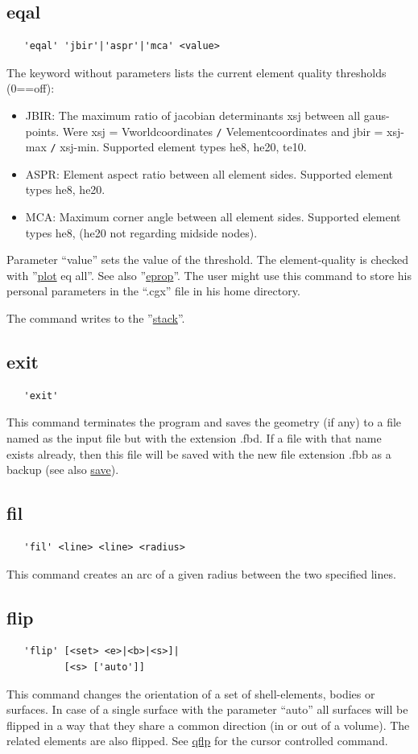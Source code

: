 \documentclass{article}
\providecommand{\htmlref}[2]{\hyperref[#2]{#1}}
\begin{document}
\subsection{\label{eqal}eqal}
\begin{verbatim}
   'eqal' 'jbir'|'aspr'|'mca' <value>
\end{verbatim}
The keyword without parameters lists the current element quality thresholds (0==off):
\begin{itemize}
\item JBIR: The maximum ratio of jacobian determinants xsj between all gaus-points. Were xsj = Vworldcoordinates \verb_/_ Velementcoordinates and jbir = xsj-max \verb_/_ xsj-min. Supported element types he8, he20, te10.
\item ASPR: Element aspect ratio between all element sides. Supported element types he8, he20.
\item MCA: Maximum corner angle between all element sides. Supported element types he8, (he20 not regarding midside nodes).
\end{itemize}
Parameter ``value'' sets the value of the threshold. The element-quality is checked with ''\htmlref{plot}{plot} eq all''. See also ''\htmlref{eprop}{eprop}''. The user might use this command to store his personal parameters in the ``.cgx'' file in his home directory.

The command writes to the ''\htmlref{stack}{stack}''.

\subsection{\label{exit}exit}
\begin{verbatim}
   'exit' 
\end{verbatim}
This command terminates the program and saves the geometry (if any) to a file named as the input file but with the extension .fbd. If a file with that name exists already, then this file will be saved with the new file extension .fbb as a backup (see also \htmlref{save}{save}).

\subsection{\label{fil}fil}
\begin{verbatim}
   'fil' <line> <line> <radius>
\end{verbatim}
This command creates an arc of a given radius between the two specified lines.

\subsection{\label{flip}flip}
\begin{verbatim}
   'flip' [<set> <e>|<b>|<s>]|
          [<s> ['auto']]

\end{verbatim}
This command changes the orientation of a set of shell-elements, bodies or surfaces. In case of a single surface with the parameter ``auto'' all surfaces will be flipped in a way that they share a common direction (in or out of a volume). The related elements are also flipped. See \htmlref{qflp}{qflp} for the cursor controlled command.
\end{document}
